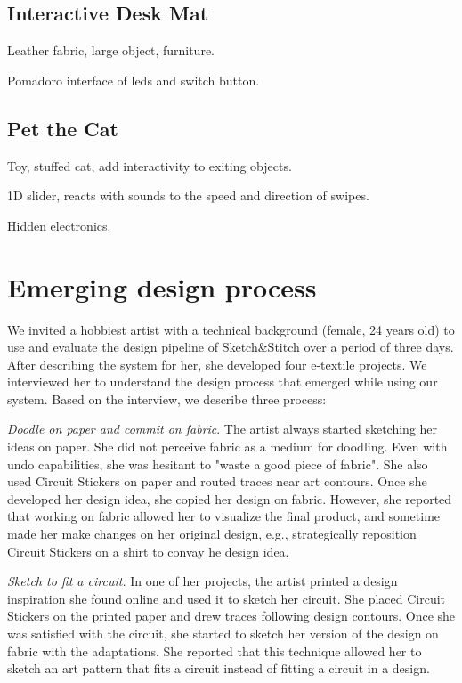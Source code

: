 \documentclass[header.tex]{subfiles}
\begin{document}
\subsection{Interactive Desk Mat}
Leather fabric, large object, furniture.

Pomadoro interface of leds and switch button.

\subsection{Pet the Cat}
Toy, stuffed cat, add interactivity to exiting objects. 

1D slider, reacts with sounds to the speed and direction of swipes.

Hidden electronics.


\section{Emerging design process}
We invited a hobbiest artist with a technical background (female, 24 years old) to use and evaluate the design pipeline of Sketch\&Stitch over a period of three days. After describing the system for her, she developed four e-textile projects. We interviewed her to understand the design process that emerged while using our system. Based on the interview, we describe three process: 

\textit{Doodle on paper and commit on fabric}. The artist always started sketching her ideas on paper. She did not perceive fabric as a medium for doodling. Even with undo capabilities, she was hesitant to "waste a good piece of fabric". She also used Circuit Stickers on paper and routed traces near art contours. Once she developed her design idea, she copied her design on fabric. However, she reported that working on fabric allowed her to visualize the final product, and sometime made her make changes on her original design, e.g., strategically reposition Circuit Stickers on a shirt to convay he design idea.

\textit{Sketch to fit a circuit.} In one of her projects, the artist printed a design inspiration she found online and used it to sketch her circuit. She placed Circuit Stickers on the printed paper and drew traces following design contours. Once she was satisfied with the circuit, she started to sketch her version of the design on fabric with the adaptations. She reported that this technique allowed her to sketch an art pattern that fits a circuit instead of fitting a circuit in a design.
\end{document}
